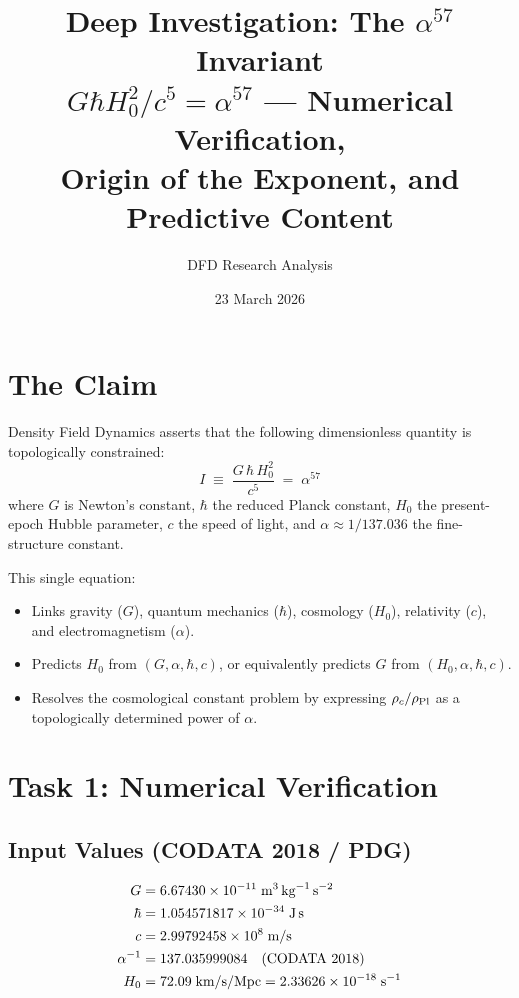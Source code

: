 \documentclass[11pt]{article}
\title{Deep Investigation: The $\alpha^{57}$ Invariant\\
\large $G\hbar H_0^2/c^5 = \alpha^{57}$ --- Numerical Verification, \\
Origin of the Exponent, and Predictive Content}
\author{DFD Research Analysis}
\date{23 March 2026}
\begin{document}
\maketitle
\tableofcontents

\section{The Claim}

Density Field Dynamics asserts that the following dimensionless quantity is
topologically constrained:
\begin{equation}
\boxed{\;I \;\equiv\; \frac{G\,\hbar\,H_0^2}{c^5} \;=\; \alpha^{57}\;}
\label{eq:invariant}
\end{equation}
where $G$ is Newton's constant, $\hbar$ the reduced Planck constant, $H_0$ the
present-epoch Hubble parameter, $c$ the speed of light, and
$\alpha \approx 1/137.036$ the fine-structure constant.

This single equation:
\begin{itemize}
\item Links gravity ($G$), quantum mechanics ($\hbar$), cosmology ($H_0$),
      relativity ($c$), and electromagnetism ($\alpha$).
\item Predicts $H_0$ from $(G, \alpha, \hbar, c)$, or equivalently predicts
      $G$ from $(H_0, \alpha, \hbar, c)$.
\item Resolves the cosmological constant problem by expressing
      $\rho_c/\rho_{\rm Pl}$ as a topologically determined power of $\alpha$.
\end{itemize}

\section{Task 1: Numerical Verification}
\label{sec:numerical}

\subsection{Input Values (CODATA 2018 / PDG)}
\begin{align}
G &= 6.67430 \times 10^{-11} \;\text{m}^3\,\text{kg}^{-1}\,\text{s}^{-2} \nonumber\\
\hbar &= 1.054571817 \times 10^{-34} \;\text{J\,s} \nonumber\\
c &= 2.99792458 \times 10^{8} \;\text{m/s} \nonumber\\
\alpha^{-1} &= 137.035999084 \quad\text{(CODATA 2018)} \nonumber\\
H_0 &= 72.09 \;\text{km/s/Mpc} = 2.33626 \times 10^{-18}\;\text{s}^{-1}
\end{align}
\end{document}

